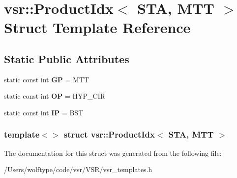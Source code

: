 \hypertarget{structvsr_1_1_product_idx_3_01_s_t_a_00_01_m_t_t_01_4}{\section{vsr\-:\-:Product\-Idx$<$ S\-T\-A, M\-T\-T $>$ Struct Template Reference}
\label{structvsr_1_1_product_idx_3_01_s_t_a_00_01_m_t_t_01_4}
}
\subsection*{Static Public Attributes}
\begin{DoxyCompactItemize}
\item 
\hypertarget{structvsr_1_1_product_idx_3_01_s_t_a_00_01_m_t_t_01_4_afe223fb6dc1dc30a6944421cdf59fbcb}{static const int {\bfseries G\-P} = M\-T\-T}\label{structvsr_1_1_product_idx_3_01_s_t_a_00_01_m_t_t_01_4_afe223fb6dc1dc30a6944421cdf59fbcb}

\item 
\hypertarget{structvsr_1_1_product_idx_3_01_s_t_a_00_01_m_t_t_01_4_a284553717d15e0d2870d77287ccb179a}{static const int {\bfseries O\-P} = H\-Y\-P\-\_\-\-C\-I\-R}\label{structvsr_1_1_product_idx_3_01_s_t_a_00_01_m_t_t_01_4_a284553717d15e0d2870d77287ccb179a}

\item 
\hypertarget{structvsr_1_1_product_idx_3_01_s_t_a_00_01_m_t_t_01_4_af0505c9f510ac1087fd726a2db6dd7cc}{static const int {\bfseries I\-P} = B\-S\-T}\label{structvsr_1_1_product_idx_3_01_s_t_a_00_01_m_t_t_01_4_af0505c9f510ac1087fd726a2db6dd7cc}

\end{DoxyCompactItemize}
\subsubsection*{template$<$$>$ struct vsr\-::\-Product\-Idx$<$ S\-T\-A, M\-T\-T $>$}



The documentation for this struct was generated from the following file\-:\begin{DoxyCompactItemize}
\item 
/\-Users/wolftype/code/vsr/\-V\-S\-R/vsr\-\_\-templates.\-h\end{DoxyCompactItemize}

